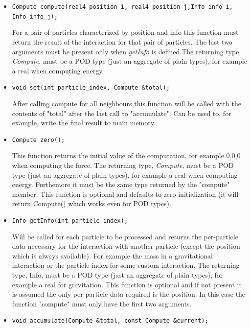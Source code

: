 \documentclass[ twoside,openright,titlepage,numbers=noenddot,%
headinclude,footinclude,cleardoublepage=empty,abstract=on,
BCOR=5mm,paper=a4,fontsize=11pt, dvipsnames
]{scrreprt}
\def\ucpp{uammd_cpp_lexer.py:UAMMDCppLexer -x}
\begin{document}
\begin{itemize}
\item \texttt{Compute compute(real4 position_i, real4 position_j,Info info_i, Info info_j);}

  
  For a pair of particles
  characterized by position and info this function must return the
  result of the interaction for that pair of particles. The last
  two arguments must be present only when \emph{getInfo} is defined.The
  returning type, \emph{Compute}, must be a POD type (just an aggregate of
  plain types), for example a real when computing energy.

\item \texttt{void set(int particle_index, Compute &total);}

  
   After calling compute for all neighbours this function will be called with the contents of "total" after the last call to "accumulate".
   Can be used to, for example, write the final result to main memory.

 \item \texttt{Compute zero();}

   
   This function returns the initial value of the computation, for example {0,0,0} when computing the force. 
   The returning type, \emph{Compute}, must be a POD type (just an aggregate of plain types), for example a real when computing energy. Furthemore it must be the same type returned by the "compute" member.
   This function is optional and defaults to zero initialization (it will return Compute() which works even for POD types).
    
 \item \texttt{Info getInfo(int particle_index);}

   
   Will be called for each particle to be processed and returns the per-particle data necessary for the interaction with another particle (except the position which is always available). For example the mass in a gravitational interaction or the particle index for some custom interaction.
   The returning type, Info, must be a POD type (just an aggregate of plain types), for example a real for gravitation.
   This function is optional and if not present it is assumed the only per-particle data required is the position. 
   In this case the function "compute" must only have the first two arguments.

 \item \texttt{void accumulate(Compute &total, const Compute &current);}


\end{itemize}
\end{document}
